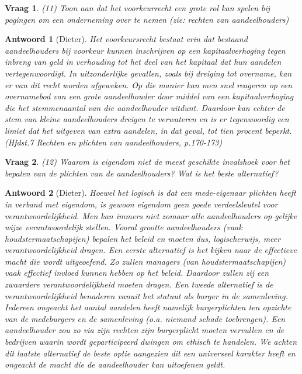 \documentclass{article}
\theoremstyle{nonumberplain}
\newtheorem{question}{Vraag}
\newtheorem{answer}{Antwoord}
\begin{document}
\begin{question}
(11)	Toon aan dat het voorkeurrecht een grote rol kan spelen bij pogingen om een onderneming over te nemen (zie: rechten van aandeelhouders)
\end{question}
\begin{answer}[Dieter]
	Het voorkeursrecht bestaat erin dat bestaand aandeelhouders bij voorkeur kunnen inschrijven op een kapitaalverhoging tegen inbreng van geld in verhouding tot het deel van het kapitaal dat hun aandelen vertegenwoordigt.
	In uitzonderlijke gevallen, zoals bij dreiging tot overname, kan er van dit recht worden afgeweken.
	Op die manier kan men snel reageren op een overnamebod van een grote aandeelhouder door middel van een kapitaalverhoging die het stemmenaantal van die aandeelhouder uitdunt.
	Daardoor kan echter de stem van kleine aandeelhouders dreigen te verwateren en is er tegenwoordig een limiet dat het uitgeven van extra aandelen, in dat geval, tot tien procent beperkt.
	\textit{(Hfdst.7 Rechten en plichten van aandeelhouders, p.170-173)}
\end{answer}

\begin{question}
(12)	Waarom is eigendom niet de meest geschikte invalshoek voor het bepalen van de plichten van de aandeelhouders? Wat is het beste alternatief?
\end{question}
\begin{answer}[Dieter]
	Hoewel het logisch is dat een mede-eigenaar plichten heeft in verband met eigendom, is gewoon eigendom geen goede verdeelsleutel voor verantwoordelijkheid.
	Men kan immers niet zomaar alle aandeelhouders op gelijke wijze verantwoordelijk stellen.
	Vooral grootte aandeelhouders (vaak houdstermaatschapijen) bepalen het beleid en moeten dus, logischerwijs, meer verantwoordelijkheid dragen.
	Een eerste alternatief is het kijken naar de effectieve macht die wordt uitgeoefend.
	Zo zullen managers (van houdstermaatschapijen) vaak effectief invloed kunnen hebben op het beleid.
	Daardoor zullen zij een zwaardere verantwoordelijkheid moeten dragen.
	Een tweede alternatief is de verantwoordelijkheid benaderen vanuit het statuut als burger in de samenleving. Iedereen ongeacht het aantal aandelen heeft namelijk burgerplichten ten opzichte van de medeburgers en de samenleving (o.a. niemand schade toebrengen).
	Een aandeelhouder zou zo via zijn rechten zijn burgerplicht moeten vervullen en de bedrijven waarin wordt geparticipeerd dwingen om ethisch te handelen.
	We achten dit laatste alternatief de beste optie aangezien dit een universeel karakter heeft en ongeacht de macht die de aandeelhouder kan uitoefenen geldt.
\end{answer}
\end{document}
